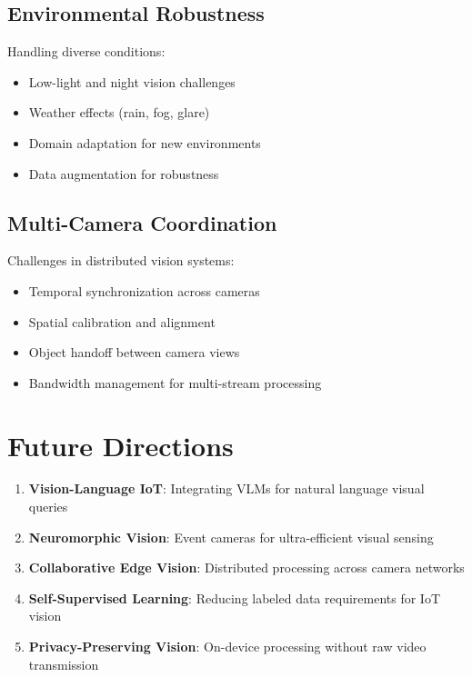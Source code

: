 \documentclass[12pt,a4paper]{article}
\begin{document}
\subsection{Environmental Robustness}

Handling diverse conditions:
\begin{itemize}
    \item Low-light and night vision challenges
    \item Weather effects (rain, fog, glare)
    \item Domain adaptation for new environments
    \item Data augmentation for robustness
\end{itemize}

\subsection{Multi-Camera Coordination}

Challenges in distributed vision systems:
\begin{itemize}
    \item Temporal synchronization across cameras
    \item Spatial calibration and alignment
    \item Object handoff between camera views
    \item Bandwidth management for multi-stream processing
\end{itemize}

\section{Future Directions}

\begin{enumerate}
    \item \textbf{Vision-Language IoT}: Integrating VLMs for natural language visual queries
    \item \textbf{Neuromorphic Vision}: Event cameras for ultra-efficient visual sensing
    \item \textbf{Collaborative Edge Vision}: Distributed processing across camera networks
    \item \textbf{Self-Supervised Learning}: Reducing labeled data requirements for IoT vision
    \item \textbf{Privacy-Preserving Vision}: On-device processing without raw video transmission
\end{enumerate}
\end{document}
